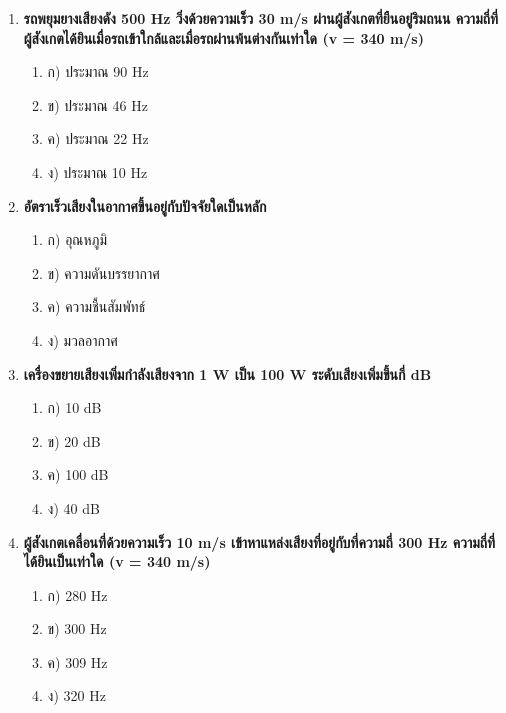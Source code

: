 \documentclass[12pt]{article}
\begin{document}
\begin{enumerate}
\begin{enumerate}
\item ค) 1.5 m
\item ง) 2 m
\end{enumerate}
\item \textbf{รถพยุมยางเสียงดัง 500 Hz วิ่งด้วยความเร็ว 30 m/s ผ่านผู้สังเกตที่ยืนอยู่ริมถนน ความถี่ที่ผู้สังเกตได้ยินเมื่อรถเข้าใกล้และเมื่อรถผ่านพ้นต่างกันเท่าใด (v = 340 m/s)}
\begin{enumerate}
\item ก) ประมาณ 90 Hz
\item ข) ประมาณ 46 Hz
\item ค) ประมาณ 22 Hz
\item ง) ประมาณ 10 Hz
\end{enumerate}
\item \textbf{อัตราเร็วเสียงในอากาศขึ้นอยู่กับปัจจัยใดเป็นหลัก}
\begin{enumerate}
\item ก) อุณหภูมิ
\item ข) ความดันบรรยากาศ
\item ค) ความชื้นสัมพัทธ์
\item ง) มวลอากาศ
\end{enumerate}
\item \textbf{เครื่องขยายเสียงเพิ่มกำลังเสียงจาก 1 W เป็น 100 W ระดับเสียงเพิ่มขึ้นกี่ dB}
\begin{enumerate}
\item ก) 10 dB
\item ข) 20 dB
\item ค) 100 dB
\item ง) 40 dB
\end{enumerate}
\item \textbf{ผู้สังเกตเคลื่อนที่ด้วยความเร็ว 10 m/s เข้าหาแหล่งเสียงที่อยู่กับที่ความถี่ 300 Hz ความถี่ที่ได้ยินเป็นเท่าใด (v = 340 m/s)}
\begin{enumerate}
\item ก) 280 Hz
\item ข) 300 Hz
\item ค) 309 Hz
\item ง) 320 Hz
\end{enumerate}
\end{enumerate}
\end{document}
